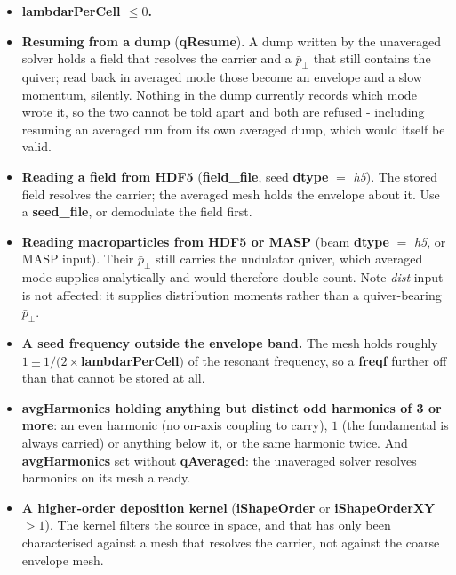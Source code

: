 \documentclass[12pt]{article}%
\begin{document}
\begin{itemize}

\item {\bf lambdarPerCell $\le 0$.}

\item {\bf Resuming from a dump} ({\bf qResume}). A dump written by the unaveraged solver holds a field that resolves the carrier and a $\bar{p}_\bot$ that still contains the quiver; read back in averaged mode those become an envelope and a slow momentum, silently. Nothing in the dump currently records which mode wrote it, so the two cannot be told apart and both are refused - including resuming an averaged run from its own averaged dump, which would itself be valid.

\item {\bf Reading a field from HDF5} ({\bf field\_file}, seed {\bf dtype} $=$ {\it h5}). The stored field resolves the carrier; the averaged mesh holds the envelope about it. Use a {\bf seed\_file}, or demodulate the field first.

\item {\bf Reading macroparticles from HDF5 or MASP} (beam {\bf dtype} $=$ {\it h5}, or MASP input). Their $\bar{p}_\bot$ still carries the undulator quiver, which averaged mode supplies analytically and would therefore double count. Note {\it dist} input is not affected: it supplies distribution moments rather than a quiver-bearing $\bar{p}_\bot$.

\item {\bf A seed frequency outside the envelope band.} The mesh holds roughly $1 \pm 1/(2\times${\bf lambdarPerCell}$)$ of the resonant frequency, so a {\bf freqf} further off than that cannot be stored at all.

\item {\bf avgHarmonics holding anything but distinct odd harmonics of 3 or more}: an even harmonic (no on-axis coupling to carry), $1$ (the fundamental is always carried) or anything below it, or the same harmonic twice. And {\bf avgHarmonics} set without {\bf qAveraged}: the unaveraged solver resolves harmonics on its mesh already.

\item {\bf A higher-order deposition kernel} ({\bf iShapeOrder} or {\bf iShapeOrderXY} $> 1$). The kernel filters the source in space, and that has only been characterised against a mesh that resolves the carrier, not against the coarse envelope mesh.

\end{itemize}
\end{document}
